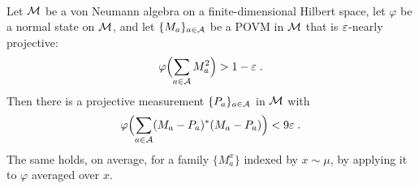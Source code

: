 \effortMedium\ \qlib

\begin{theorem}[Orthonormalization]
\label{thm:orthonormalization}
\leanok
Let $\cal{M}$ be a von Neumann algebra on a finite-dimensional Hilbert space, let
$\varphi$ be a normal state on $\cal{M}$, and let $\{M_a\}_{a \in \mA}$ be a POVM in
$\cal{M}$ that is $\eps$-nearly projective:
\begin{equation*}
  \varphi\Bigl( \sum_{a \in \mA} M_a^2 \Bigr) > 1 - \eps\;.
\end{equation*}
Then there is a projective measurement $\{P_a\}_{a \in \mA}$ in $\cal{M}$ with
\begin{equation*}
  \varphi\Bigl( \sum_{a \in \mA} (M_a - P_a)^*(M_a - P_a) \Bigr) < 9\eps\;.
\end{equation*}
The same holds, on average, for a family $\{M^x_a\}$ indexed by $x \sim \mu$, by applying
it to $\varphi$ averaged over $x$.
\end{theorem}

